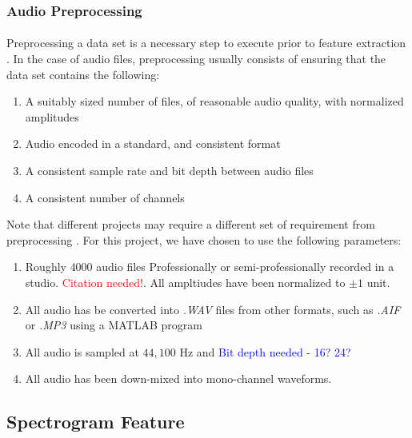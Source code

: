 \documentclass[12pt,letterpaper]{article}
\begin{document}

\subsubsection{Audio Preprocessing}
\label{subsubsec-Preprocessing}

\paragraph*{}Preprocessing a data set is a necessary step to execute prior to feature extraction \cite{Geron2,James}. In the case of audio files, preprocessing usually consists of ensuring that the data set contains the following:
\begin{enumerate}
\item A suitably sized number of files, of reasonable audio quality, with normalized amplitudes
\item Audio encoded in a standard, and consistent format
\item A consistent sample rate and bit depth between audio files
\item A consistent number of channels
\end{enumerate}
Note that different projects may require a different set of requirement from preprocessing \cite{Virtanen}. For this project, we have chosen to use the following parameters:
\begin{enumerate}
\item Roughly $4000$ audio files Professionally or semi-professionally recorded in a studio. \textcolor{red}{Citation needed!}. All ampltiudes have been normalized to $\pm 1$ unit.
\item All audio has be converted into \textit{.WAV} files from other formats, such as \textit{.AIF} or \textit{.MP3} using a MATLAB program
\item All audio is sampled at $44,100$ Hz and \textcolor{blue}{Bit depth needed - 16? 24?}
\item All audio has been down-mixed into mono-channel waveforms.
\end{enumerate}


\newpage

\subsection{Spectrogram Feature}
\label{subsec-spectrogram}
\end{document}
